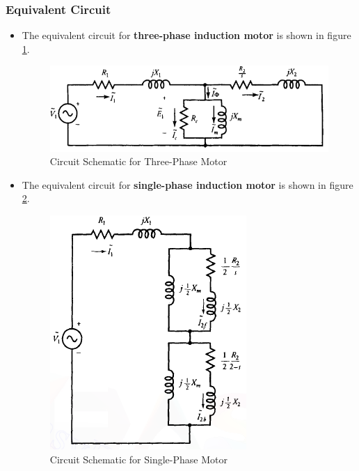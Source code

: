 \documentclass[journal]{IEEEtran}
\begin{document}
\subsubsection{Equivalent Circuit}
\begin{itemize}
    \item The equivalent circuit for \textbf{three-phase induction motor} is shown in figure \ref{fig:threecir}.
    \begin{figure}[h]
    \centering
    \includegraphics[scale=0.40]{Induction/three_circuit.PNG}
    \caption{Circuit Schematic for Three-Phase Motor \cite{guru2007}}
    \label{fig:threecir}
    \end{figure}
    
    \item The equivalent circuit for \textbf{single-phase induction motor} is shown in figure \ref{fig:singlecir}.
    \begin{figure}[h]
    \centering
    \includegraphics[scale=0.55]{Induction/single_circuit.PNG}
    \caption{Circuit Schematic for Single-Phase Motor \cite{guru2007}}
    \label{fig:singlecir}
    \end{figure}
\end{itemize}
\end{document}
